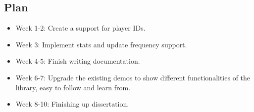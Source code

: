 \documentclass[11pt]{article}
\begin{document}
\subsection{Plan}\label{plan}

\begin{itemize}
    \item Week 1-2: Create a support for player IDs. 
    \item Week 3: Implement stats and update frequency support.
    \item Week 4-5: Finish writing documentation.
    \item Week 6-7: Upgrade the existing demos to show different functionalities of the library, easy to follow and learn from. 
    \item Week 8-10: Finishing up dissertation. 
\end{itemize}



    
    
    
\end{document}
